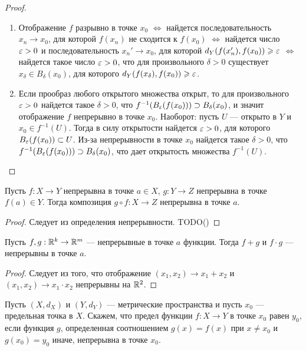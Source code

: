 \documentclass[a4paper]{article}
\theoremstyle{named}
\begin{document}
        \begin{proof}
            ~

            \begin{enumerate}
            \item
                Отображение $f$ разрывно в точке $x_0$ $\iff$ найдется последовательность $x_n \to x_0$, для которой $f(x_n)$ не сходится к $f(x_0)$ $\iff$ найдется число $\varepsilon > 0$ и последовательность $x_n' \to x_0$, для которой $d_Y(f(x_n'), f(x_0)) \geqslant \varepsilon$ $\iff$ найдется такое число $\varepsilon > 0$, что для произвольного $\delta > 0$ существует $x_{\delta} \in B_{\delta}(x_0)$, для которого $d_Y(f(x_\delta), f(x_0)) \geqslant \varepsilon$.

            \item
                Если прообраз любого открытого множества открыт, то для произвольного $\varepsilon > 0$ найдется такое $\delta > 0$, что $f^{-1}(B_{\varepsilon}(f(x_0))) \supset B_{\delta}(x_0)$, и значит отображение $f$ непрерывно в точке $x_0$. Наоборот: пусть $U$ --- открыто в $Y$ и $x_0 \in f^{-1}(U)$. Тогда в силу открытости найдется $\varepsilon > 0$, для которого $B_{\varepsilon}(f(x_0)) \subset U$. Из-за непрерывности в точке $x_0$ найдется такое $\delta > 0$, что $f^{-1}(B_{\varepsilon}(f(x_0))) \supset B_{\delta}(x_0)$, что дает открытость множества $f^{-1}(U)$.
            \end{enumerate} 
        \end{proof}

        \begin{proposal*}
            Пусть $f: X \to Y$ непрерывна в точке $a \in X$, $g: Y \to Z$ непрерывна в точке $f(a) \in Y$. Тогда композиция $g \circ f: X \to Z$ непрерывна в точке $a$.
        \end{proposal*}

        \begin{proof}
            Следует из определения непрерывности. TODO()
        \end{proof}

        \begin{consequence*}
            Пусть $f, g: \mathbb{R}^k \to \mathbb{R}^m$ --- непрерывные в точке $a$ функции. Тогда $f + g$ и $f \cdot g$ --- непрерывны в точке $a$.
        \end{consequence*}

        \begin{proof}
            Следует из того, что отображение $(x_1, x_2) \to x_1 + x_2$ и $(x_1, x_2) \to x_1 \cdot x_2$ непрерывны на $\mathbb{R}^2$.
        \end{proof}

        \begin{definition*}
            Пусть $(X, d_X)$ и $(Y, d_Y)$ --- метрические пространства и пусть $x_0$ --- предельная точка в $X$. Скажем, что предел функции $f: X \to Y$ в точке $x_0$ равен $y_0$, если функция $g$, определенная соотношением $g(x) = f(x)$ при $x \neq x_0$ и $g(x_0) = y_0$ иначе, непрерывна в точке $x_0$.
        \end{definition*}
        
\end{document}
